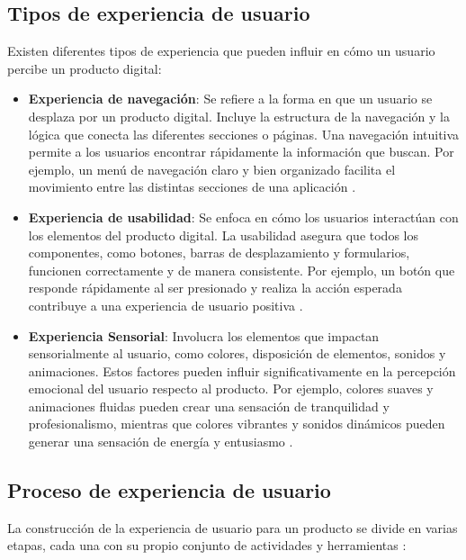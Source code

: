 \subsection{Tipos de experiencia de usuario}
Existen diferentes tipos de experiencia que pueden influir en cómo un usuario percibe un producto digital:

\begin{itemize}
    \item \textbf{Experiencia de navegación}: Se refiere a la forma en que un usuario se desplaza por un producto digital. Incluye la estructura de la navegación y la lógica que conecta las diferentes secciones o páginas. Una navegación intuitiva permite a los usuarios encontrar rápidamente la información que buscan. Por ejemplo, un menú de navegación claro y bien organizado facilita el movimiento entre las distintas secciones de una aplicación \cite{Chacon2024}.
    \item \textbf{Experiencia de usabilidad}: Se enfoca en cómo los usuarios interactúan con los elementos del producto digital. La usabilidad asegura que todos los componentes, como botones, barras de desplazamiento y formularios, funcionen correctamente y de manera consistente. Por ejemplo, un botón que responde rápidamente al ser presionado y realiza la acción esperada contribuye a una experiencia de usuario positiva \cite{Chacon2024}.
    \item \textbf{Experiencia Sensorial}: Involucra los elementos que impactan sensorialmente al usuario, como colores, disposición de elementos, sonidos y animaciones. Estos factores pueden influir significativamente en la percepción emocional del usuario respecto al producto. Por ejemplo, colores suaves y animaciones fluidas pueden crear una sensación de tranquilidad y profesionalismo, mientras que colores vibrantes y sonidos dinámicos pueden generar una sensación de energía y entusiasmo \cite{Chacon2024}.
\end{itemize}

\subsection{Proceso de experiencia de usuario}
La construcción de la experiencia de usuario para un producto se divide en varias etapas, cada una con su propio conjunto de actividades y herramientas \cite{Leon2013}:

